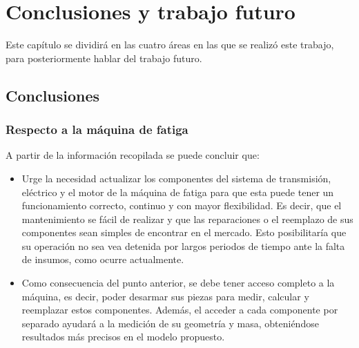 \chapter{Conclusiones y trabajo futuro}

Este capítulo se dividirá en las cuatro áreas en las que se realizó este trabajo, para posteriormente hablar del trabajo futuro. 

\section{Conclusiones}

\subsection{Respecto a la máquina de fatiga}

A partir de la información recopilada se puede concluir que:
\begin{itemize}
	\item Urge la necesidad actualizar los componentes del sistema de transmisión, eléctrico y el motor de la máquina de fatiga para que esta puede tener un funcionamiento correcto, continuo y con mayor flexibilidad. Es decir, que el mantenimiento se fácil de realizar y que las reparaciones o el reemplazo de sus componentes sean simples de encontrar en el mercado. Esto posibilitaría que su operación no sea vea detenida por largos periodos de tiempo ante la falta de insumos, como ocurre actualmente.
	\item Como consecuencia del punto anterior, se debe tener acceso completo a la máquina, es decir, poder desarmar sus piezas para medir, calcular y reemplazar estos componentes. Además, el acceder a cada componente por separado ayudará a la medición de su geometría y masa, obteniéndose resultados más precisos en el modelo propuesto.
\end{itemize}

\newpage

